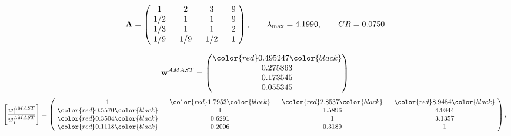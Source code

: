 \begin{example}
\begin{equation*}
\mathbf{A} =
\begin{pmatrix}
$\,\,$ 1 $\,\,$ & $\,\,$2$\,\,$ & $\,\,$3$\,\,$ & $\,\,$9 $\,\,$ \\
$\,\,$ 1/2$\,\,$ & $\,\,$ 1 $\,\,$ & $\,\,$1$\,\,$ & $\,\,$9 $\,\,$ \\
$\,\,$ 1/3$\,\,$ & $\,\,$ 1 $\,\,$ & $\,\,$ 1 $\,\,$ & $\,\,$2 $\,\,$ \\
$\,\,$ 1/9$\,\,$ & $\,\,$ 1/9$\,\,$ & $\,\,$ 1/2$\,\,$ & $\,\,$ 1  $\,\,$ \\
\end{pmatrix},
\qquad
\lambda_{\max} =
4.1990,
\qquad
CR = 0.0750
\end{equation*}

\begin{equation*}
\mathbf{w}^{AMAST} =
\begin{pmatrix}
\color{red} 0.495247\color{black} \\
0.275863\\
0.173545\\
0.055345
\end{pmatrix}\end{equation*}
\begin{equation*}
\left[ \frac{{w}^{AMAST}_i}{{w}^{AMAST}_j} \right] =
\begin{pmatrix}
$\,\,$ 1 $\,\,$ & $\,\,$\color{red} 1.7953\color{black} $\,\,$ & $\,\,$\color{red} 2.8537\color{black} $\,\,$ & $\,\,$\color{red} 8.9484\color{black} $\,\,$ \\
$\,\,$\color{red} 0.5570\color{black} $\,\,$ & $\,\,$ 1 $\,\,$ & $\,\,$1.5896$\,\,$ & $\,\,$4.9844  $\,\,$ \\
$\,\,$\color{red} 0.3504\color{black} $\,\,$ & $\,\,$0.6291$\,\,$ & $\,\,$ 1 $\,\,$ & $\,\,$3.1357 $\,\,$ \\
$\,\,$\color{red} 0.1118\color{black} $\,\,$ & $\,\,$0.2006$\,\,$ & $\,\,$0.3189$\,\,$ & $\,\,$ 1  $\,\,$ \\
\end{pmatrix},
\end{equation*}


\end{example}
